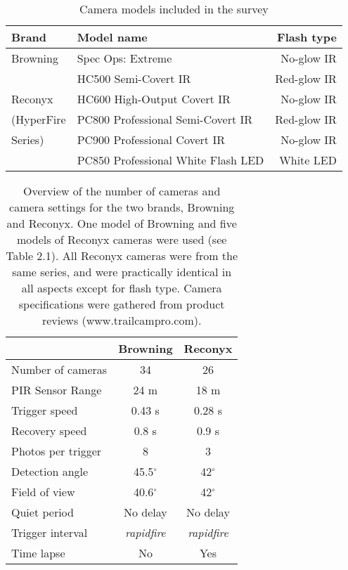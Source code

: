 

\begin{table}[h]
\caption{Camera models included in the survey}
\label{tab:cam_mod}
\centering

\begin{tabular}{llr}
\hline
Brand  & Model name & Flash type  \\
\hline 
Browning	& Spec Ops: Extreme 					& No-glow IR \\
			& HC500 Semi-Covert IR					& Red-glow IR \\
Reconyx		& HC600 High-Output Covert IR			& No-glow IR  \\
(HyperFire 	& PC800 Professional Semi-Covert IR 	& Red-glow IR \\
Series) 		& PC900 Professional Covert IR 			& No-glow IR  \\
    		& PC850 Professional White Flash LED	& White LED  \\
\hline
\end{tabular}
\end{table}


\begin{table}[h]
\caption[Camera settings and features]
{\footnotesize Overview of the number of cameras and camera settings for the two brands, Browning and Reconyx. One model of Browning and five models of Reconyx cameras were used (see Table 2.1). All Reconyx cameras were from the same series, and were practically identical in all aspects except for flash type. Camera specifications were gathered from product reviews (www.trailcampro.com). }
\label{tab:cam_set}
\centering
\begin{tabular}{lcc}
\hline 
 & Browning & Reconyx \\ 
\hline 
Number of cameras & 34 	& 26 \\  
PIR Sensor Range & 24 m	&	18 m \\
Trigger speed 		& 0.43 s 	& 0.28 s \\ 
Recovery speed 	& 0.8 s		& 0.9 s \\ 
Photos per trigger 	& 8 		& 3 \\  
Detection angle 	& 45.5$^{\circ}$ 	& 42$^{\circ}$ \\ 
Field of view 		& 40.6$^{\circ}$ 	& 42$^{\circ}$ \\  
Quiet period 		& No delay 	& No delay \\ 
Trigger interval	& \emph{rapidfire} & \emph{rapidfire} \\
Time lapse			& No	 	& Yes \\
\hline 
\end{tabular} 
\end{table}




